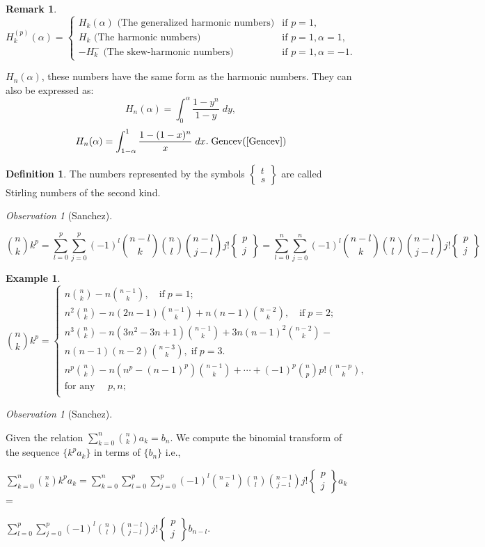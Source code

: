 \documentclass[a4paper,10pt,oneside]{article}
\newtheorem{example}{Example}[section]
\newtheorem{remark}{Remark}[section]
\newcommand{\st}[2]{\mbox{$\left\{\begin{array}{c}{#1}\\{#2} \end{array}\right\}$}}
\theoremstyle{definition}
\newtheorem{definition}[theorem]{Definition}
\theoremstyle{remark}
\newtheorem{observation}[theorem]{Observation}
\begin{document}
\begin{description}
\begin{remark}
 $ H_k^{(p)}(\alpha)=\begin{cases}H_k(\alpha)\text{ (The generalized harmonic numbers)}&{\text{if }p=1},\\
 H_k\text{ (The  harmonic numbers)}&{\text{if }p=1,\alpha=1},\\
 - H_k^-\text{ (The skew-harmonic numbers)}&{\text{if }p=1,\alpha=-1}.
 \end{cases}$\par
 \end{remark}
 
 
 $ H_n(\alpha)$, these numbers have the same form as the harmonic numbers. They can also be expressed as:
$$ H_n(\alpha)=\int_{0}^{\alpha}\frac{1-y^n}{1-y}\;dy,$$
 $$H_n(\alpha)=\int_{1-\alpha}^{1}\frac{1-(1-x)^n}{x}\;dx.\;\text{Gencev} (\cite{Gencev}) $$
\begin{definition}
\label{stirling}
The numbers represented by the symbols \st{t}{s} are called Stirling numbers of the second kind.

\end{definition}
\item \begin{observation}[Sanchez\cite{sanchez}]\label{sanchezlemma}\par
 $$\binom{n}{k}k^p=\sum_{l=0}^p\sum_{j=0}^p(-1)^l\binom{n-l}{k}\binom{n}{l}\binom{n-l}{j-l}j!\st{p}{j}=
 {\sum_{l=0}^n\sum_{j=0}^n(-1)^l\binom{n-l}{k}\binom{n}{l}\binom{n-l}{j-l}j!\st{p}{j}}$$
 \begin{example}\label{exsanchez}
 $$\binom{n}{k}k^p =\left\{\begin{array}{l} n\binom{n}{k}-n\binom{n-1}{k},\quad \text{if} \; p=1;\\
  n^2\binom{n}{k}-n(2n-1)\binom{n-1}{k} +n(n-1)\binom{n-2}{k},\quad \text{if} \; p=2;\\
n^3\binom{n}{k}-n(3n^2-3n+1)\binom{n-1}{k}+3n(n-1)^2
\binom{n-2}{k}-\\ 
n(n-1)(n-2)\binom{n-3}{k},\; \text{if}\; p =3.\\
n^p\binom{n}{k}-n(n^p-(n-1)^p)\binom{n-1}{k}+\cdots+ (-1)^p\binom{n}{p}p!\binom{n-p}{k},\,\\ \text{for any }\quad p, n ;\\
 \end{array}\label{sanchez2}
 \right.$$
 \end{example}
\end{observation}
 \item \begin{observation}[Sanchez\cite{sanchez}]\label{sanchez}\par
Given the relation $\sum_{k=0}^n\binom{n}{k}a_k=b_n$. We compute the binomial transform of the sequence $\{k^pa_k\}$ in terms of 
 $\{b_n\}$ i.e.,\par
 $\sum_{k=0}^n\binom{n}{k}k^pa_k=\sum_{k=0}^n\sum_{l=0}^p\sum_{j=0}^p(-1)^l\binom{n-1}{k}\binom{n}{l}
 \binom{n-1}{j-1}j!\st{p}{j}a_k$ =\par
 $\sum_{l=0}^p\sum_{j=0}^p(-1)^l\binom{n}{l}\binom{n-l}{j-l}j!\st{p}{j}b_{n-l}.$\par


\end{observation}
\end{description}
\end{document}
